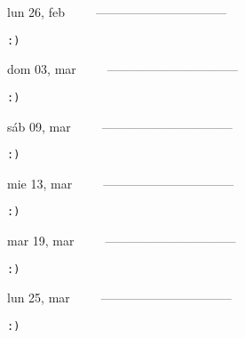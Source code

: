\documentclass[letterpaper,10pt]{article}
\begin{document}
\begin{multicols}{3}
{lun 26, feb\ \ \ \ \ --------------------------------}
\begin{flushright}\begin{small}\texttt{:)}\end{small}\end{flushright}
\vfill
{dom 03, mar\ \ \ \ \ --------------------------------}
\begin{flushright}\begin{small}\texttt{:)}\end{small}\end{flushright}\par
\vfill
{sáb 09, mar\ \ \ \ \ --------------------------------}
\begin{flushright}\begin{small}\texttt{:)}\end{small}\end{flushright}\par
\vfill
\end{multicols}
\vspace{1.05cm}

\begin{multicols}{3}
{mie 13, mar\ \ \ \ \ --------------------------------}
\begin{flushright}\begin{small}\texttt{:)}\end{small}\end{flushright}
\vfill
{mar 19, mar\ \ \ \ \ --------------------------------}
\begin{flushright}\begin{small}\texttt{:)}\end{small}\end{flushright}\par
\vfill
{lun 25, mar\ \ \ \ \ --------------------------------}
\begin{flushright}\begin{small}\texttt{:)}\end{small}\end{flushright}\par
\vfill
\end{multicols}
\vspace{1.05cm}
\end{document}

